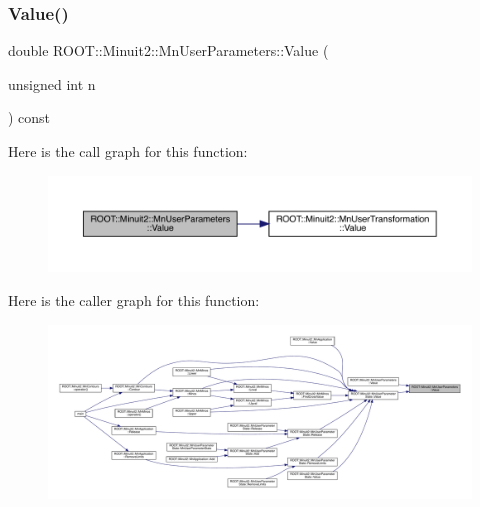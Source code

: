 \subsubsection{\texorpdfstring{Value()}{Value()}\hspace{0.1cm}{\footnotesize\ttfamily [1/4]}}
{\footnotesize\ttfamily double R\+O\+O\+T\+::\+Minuit2\+::\+Mn\+User\+Parameters\+::\+Value (\begin{DoxyParamCaption}\item[{unsigned int}]{n }\end{DoxyParamCaption}) const}

Here is the call graph for this function\+:\nopagebreak
\begin{figure}[H]
\begin{center}
\leavevmode
\includegraphics[width=350pt]{d6/d10/classROOT_1_1Minuit2_1_1MnUserParameters_a5084b0d1312ddb87609ff726a11fd7f6_cgraph}
\end{center}
\end{figure}
Here is the caller graph for this function\+:\nopagebreak
\begin{figure}[H]
\begin{center}
\leavevmode
\includegraphics[width=350pt]{d6/d10/classROOT_1_1Minuit2_1_1MnUserParameters_a5084b0d1312ddb87609ff726a11fd7f6_icgraph}
\end{center}
\end{figure}
\mbox{\label{classROOT_1_1Minuit2_1_1MnUserParameters_a5084b0d1312ddb87609ff726a11fd7f6}} 
